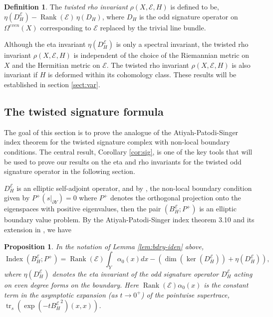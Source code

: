 \documentclass[12pt]{amsart}
\theoremstyle{plain}
\newtheorem{proposition}[theorem]{Proposition}
\theoremstyle{definition}
\newtheorem{definition}[theorem]{Definition}
\theoremstyle{remark}
\begin{document}
\begin{definition}\label{DefRho}
The {\em twisted rho invariant} 
$\rho(X, {\mathcal E}, H)$ is defined to be, $\eta(D^{\mathcal E}_H ) - {\operatorname{Rank}}({\mathcal E})\, \eta(D_H )$, where 
$D_H$ is the odd signature operator on $\Omega^{even}(X)$ {{corresponding to ${\mathcal E}$ replaced by the trivial line bundle}}.
\end{definition}

Although the eta invariant  $\eta(D^{\mathcal E}_H )$  is only a spectral invariant, 
the twisted rho invariant $\rho(X,{\mathcal E},H)$ is independent of the
choice of the Riemannian metric on $X$ and the Hermitian metric on ${\mathcal E}$.
The twisted rho invariant $\rho(X,{\mathcal E},H)$ is also invariant if $H$ is deformed within its cohomology class.
These results will be established in section \ref{sect:var}.

\subsection{The twisted signature formula}
\label{sect:twistedsig}

The goal of this section is to prove the analogue of the Atiyah-Patodi-Singer index theorem for the 
twisted signature complex with non-local boundary conditions. The central result, Corollary \ref{cor:sig},
is one of the key tools that will be used to prove our results on the eta and rho invariants for the twisted odd signature
operator in the following section.

$D^{\mathcal E}_H$ is an elliptic self-adjoint operator, and 
by \cite{APS3}, the non-local boundary condition given by $P^+(s\big|_{\partial Y})=0$
where $P^+$ denotes the orthogonal projection onto the eigenspaces with positive eigenvalues,
then the pair $(B^{\mathcal E}_H; P^+)$ is an elliptic boundary value problem. 
By the Atiyah-Patodi-Singer index theorem 3.10 \cite{APS1} and its extension in \cite{GilkeyBook}, we have

\begin{proposition}\label{prop:sig1}
In the notation of Lemma \ref{lem:bdry-iden} above,
$$
{\operatorname{Index}}(B^{\mathcal E}_H; P^+) = {\operatorname{Rank}}({\mathcal E}) \int_Y \alpha_0(x)dx - \left(\dim(\ker(D^{\mathcal E}_H))
+\eta(D^{\mathcal E}_H)\right),
$$
where $\eta(D^{\mathcal E}_H)$ denotes the eta invariant of the odd signature operator $D^{\mathcal E}_H$ acting on even degree
forms on the boundary. Here $ {\operatorname{Rank}}({\mathcal E}) \alpha_0(x)$ is the constant term in the asymptotic expansion (as $t\to 0^+$) 
of the pointwise supertrace, ${\operatorname{tr}}_s(\exp(-t{B^{\mathcal E}_H}^2)(x, x))$.
\end{proposition}
\end{document}
